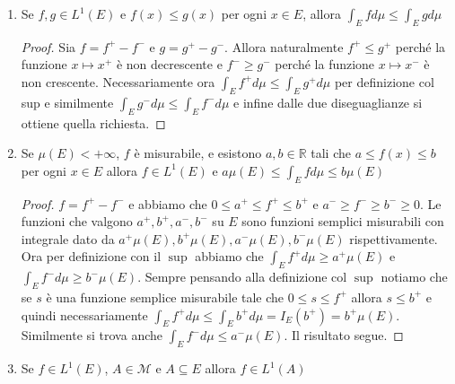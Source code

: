\begin{enumerate}[label = \arabic*.]
\begin{proof}
         Ora possiamo estendere a \(f\) misurabile e \(\alpha \in \mathbb{R}\)
         scrivendo \(f = f^{+} - f^{-}\) e osservando che \(\alpha f =
         \text{sign}(\alpha) |\alpha| f^{+} - \text{sign}(\alpha) |\alpha|
         f^{-}\) dove se \(\alpha < 0\)  allora \(-\text{sign}(\alpha) f^{-}\) e
     \(- \text{sign}(\alpha) f^{+}\) sono non negative e misurabili.
    \end{proof}
    \item Se \(f, g \in L^{1}(E)\) e \(f(x) \le g(x)\) per ogni \(x \in E\),
        allora \(\int_{E} f d\mu \le \int_{E} g d\mu\)
    \begin{proof}
        Sia \(f = f^{+} - f^{-}\) e \(g = g^{+} - g^{-}\). Allora naturalmente
        \(f^{+} \le g^{+}\) perché la funzione \(x \mapsto x^{+}\) è non
        decrescente e \(f^{-} \ge g^{-}\) perché la funzione \(x \mapsto x^{-}\)
        è non crescente. Necessariamente ora \(\int_E f^{+} d\mu \le \int_E
        g^{+} d\mu\) per definizione col sup e similmente \(\int_E g^{-} d\mu
        \le \int_E f^{-} d\mu\) e infine dalle due diseguaglianze si ottiene
        quella richiesta.
    \end{proof}
    \item Se \(\mu(E) < +\infty\), \(f\)  è misurabile, e esistono \(a, b \in
        \mathbb{R}\) tali che \(a \le f(x) \le b\) per ogni \(x \in E\) allora
        \(f \in L^{1}(E)\) e \(a \mu(E) \le \int_E f d\mu \le b\mu(E)\) 
    \begin{proof}
        \(f = f^{+} - f^{-}\) e abbiamo che \(0 \le a^+ \le f^{+} \le b^{+}\) e
        \(a^{-} \ge f^{-} \ge b^{-} \ge 0\). Le funzioni che valgono \(a^{+},
        b^{+}, a^{-}, b^{-}\) su \(E\) sono funzioni semplici misurabili con
        integrale dato da \(a^{+} \mu(E), b^{+} \mu(E), a^{-} \mu(E), b^{-}
        \mu(E)\) rispettivamente. Ora per definizione con il \(\sup\) abbiamo
        che \(\int_E f^{+} d\mu \ge a^{+} \mu(E)\) e \(\int_E f^{-} d\mu \ge
        b^{-} \mu(E)\). Sempre pensando alla definizione col \(\sup\) notiamo
        che se \(s\) è una funzione semplice misurabile tale che \(0 \le s \le
        f^{+}\) allora \(s \le b^{+}\) e quindi necessariamente \(\int_E f^{+}
        d\mu \le \int_E b^{+} d\mu = I_E(b^{+}) = b^{+} \mu(E)\). Similmente si
        trova anche \(\int_E f^{-}d\mu \le a^{-} \mu(E)\). Il risultato segue.
    \end{proof}
    \item Se \(f \in L^{1}(E)\), \(A \in \mathcal{M}\) e \(A \subseteq E \)
        allora \(f \in L^{1}(A)\) 

\end{enumerate}
